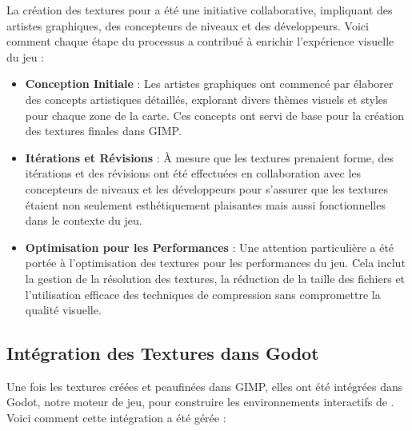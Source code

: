La création des textures pour \gameName a été une initiative collaborative, impliquant des artistes graphiques, 
des concepteurs de niveaux et des développeurs. Voici comment chaque étape du processus a contribué à enrichir l'expérience visuelle du jeu :
\\

\begin{itemize}
    \item \textbf{Conception Initiale} : Les artistes graphiques ont commencé par élaborer des concepts artistiques détaillés, explorant divers thèmes visuels et styles pour chaque zone de la carte. Ces concepts ont servi de base pour la création des textures finales dans GIMP.
    \\

    \item \textbf{Itérations et Révisions} : À mesure que les textures prenaient forme, des itérations et des révisions ont été effectuées en collaboration avec les concepteurs de niveaux et les développeurs pour s'assurer que les textures étaient non seulement esthétiquement plaisantes mais aussi fonctionnelles dans le contexte du jeu.
    \\

    \item \textbf{Optimisation pour les Performances} : Une attention particulière a été portée à l'optimisation des textures pour les performances du jeu. Cela inclut la gestion de la résolution des textures, la réduction de la taille des fichiers et l'utilisation efficace des techniques de compression sans compromettre la qualité visuelle.
\end{itemize}

\subsection*{Intégration des Textures dans Godot}

Une fois les textures créées et peaufinées dans GIMP, elles ont été intégrées dans Godot, notre moteur de jeu,
 pour construire les environnements interactifs de \gameName. Voici comment cette intégration a été gérée :
\\

